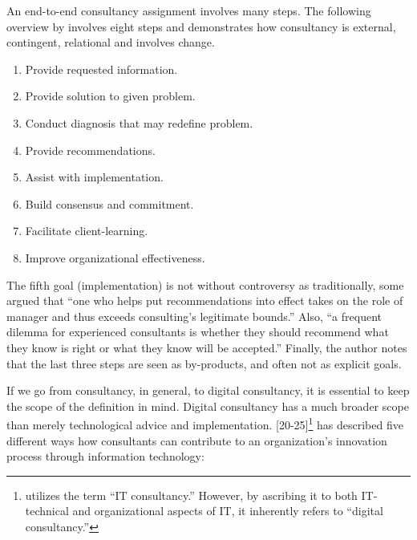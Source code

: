 \documentclass[12pt]{article}
\providecommand{\tightlist}{%
  \setlength{\itemsep}{0pt}\setlength{\parskip}{0pt}}
\begin{document}
An end-to-end consultancy assignment involves many steps. The following
overview by \citet{turner1982} involves eight steps and demonstrates how
consultancy is external, contingent, relational and involves change.

\begin{enumerate}
\def\labelenumi{\arabic{enumi}.}
\tightlist
\item
  Provide requested information.
\item
  Provide solution to given problem.
\item
  Conduct diagnosis that may redefine problem.
\item
  Provide recommendations.
\item
  Assist with implementation.
\item
  Build consensus and commitment.
\item
  Facilitate client-learning.
\item
  Improve organizational effectiveness.
\end{enumerate}

The fifth goal (implementation) is not without controversy as
traditionally, some argued that ``one who helps put recommendations into
effect takes on the role of manager and thus exceeds consulting's
legitimate bounds.'' \citep{turner1982} Also, ``a frequent dilemma for
experienced consultants is whether they should recommend what they know
is right or what they know will be accepted.'' Finally, the author notes
that the last three steps are seen as by-products, and often not as
explicit goals.

If we go from consultancy, in general, to digital consultancy, it is
essential to keep the scope of the definition in mind. Digital
consultancy has a much broader scope than merely technological advice
and implementation. \citet{swanson2010} {[}20-25{]}\footnote{\citet{swanson2010}
  utilizes the term ``IT consultancy.'' However, by ascribing it to both
  IT-technical and organizational aspects of IT, it inherently refers to
  ``digital consultancy.''} has described five different ways how
consultants can contribute to an organization's innovation process
through information technology:
\end{document}
